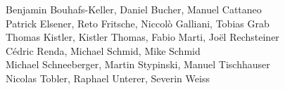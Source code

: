 %
%
%
Benjamin Bouhafs-Keller,	%
Daniel Bucher, 			%
Manuel Cattaneo%
\\
Patrick Elsener,		%
Reto Fritsche,			%
Niccolò Galliani,		%
Tobias Grab%
\\
Thomas Kistler,		%
Kistler Thomas,		%
Fabio Marti,			%
Joël Rechsteiner%
\\
Cédric Renda,			%
Michael Schmid,			%
Mike Schmid%
\\
Michael Schneeberger,		%
Martin Stypinski,		%
Manuel Tischhauser%
\\
Nicolas Tobler,			%
Raphael Unterer,		%
Severin Weiss%

